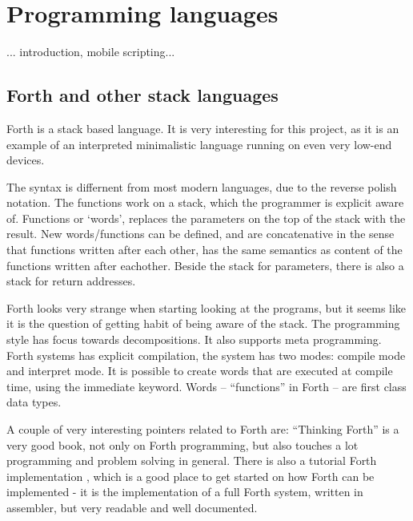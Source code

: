 \documentclass[11pt]{report}
\begin{document}
\section{Programming languages}
... introduction, mobile scripting...

\subsection{Forth and other stack languages}
Forth is a stack based language.
It is very interesting for this project, as it is an example of an interpreted minimalistic language running on even very low-end devices.

The syntax is differnent from most modern languages, due to the reverse polish notation.
The functions work on a stack, which the programmer is explicit aware of. 
Functions or `words', replaces the parameters on the top of the stack with the result. 
New words/functions can be defined, and are concatenative in the sense that functions written after each other, has the same semantics as content of the functions written after eachother.
Beside the stack for parameters, there is also a stack for return addresses.

Forth looks very strange when starting looking at the programs, but it seems like it is the question of getting habit of being aware of the stack.
The programming style has focus towards decompositions. It also supports meta programming.
Forth systems has explicit compilation, the system has two modes: compile mode and interpret mode. 
It is possible to create words that are executed at compile time, using the immediate keyword.
Words -- ``functions'' in Forth -- are first class data types.

A couple of very interesting pointers related to Forth are: 
``Thinking Forth'' is a very good book, not only on Forth programming, but also touches a lot programming and problem solving in general.
There is also a tutorial Forth implementation \cite{jonesforth}, which is a good place to get started on how Forth can be implemented - it is the implementation of a full Forth system, written in assembler, but very readable and well documented.
\end{document}

